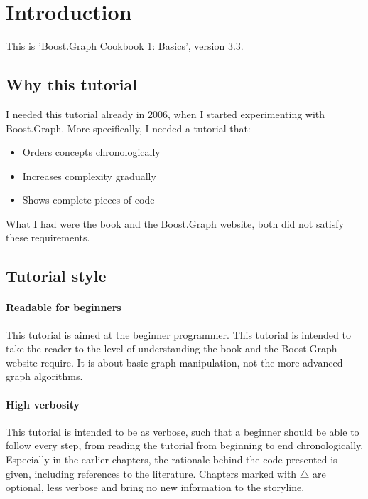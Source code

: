 \section{Introduction}

This is 'Boost.Graph Cookbook 1: Basics', version 3.3.

\subsection{Why this tutorial}

I needed this tutorial already in 2006, when I started experimenting with
Boost.Graph.
More specifically, I needed a tutorial that:

\begin{itemize}
  \item Orders concepts chronologically
  \item Increases complexity gradually
  \item Shows complete pieces of code
\end{itemize}

What I had were the book \cite{siek2001boost}
and the Boost.Graph website, both did not satisfy these requirements.

\subsection{Tutorial style}

\paragraph{Readable for beginners}

This tutorial is aimed at the beginner programmer.
This tutorial is intended to take the reader to the level of understanding
the book \cite{siek2001boost}
and the Boost.Graph website require.
It is about basic graph manipulation, not the more advanced graph algorithms.
 
\paragraph{High verbosity}

This tutorial is intended to be as verbose, such that a beginner should
be able to follow every step, from reading the tutorial from beginning
to end chronologically.
Especially in the earlier chapters, the rationale behind the code presented
is given, including references to the literature.
Chapters marked with $\triangle$ are optional, 
less verbose and bring no new information to the storyline.

